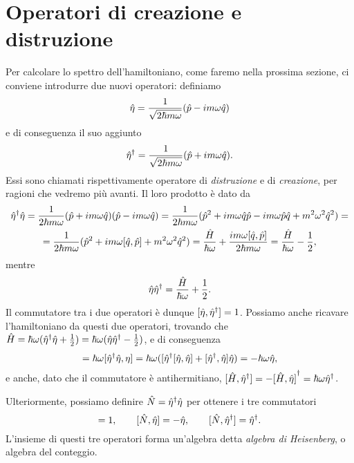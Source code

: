 \section{Operatori di creazione e distruzione}
Per calcolare lo spettro dell'hamiltoniano, come faremo nella prossima sezione, ci conviene introdurre due nuovi operatori: definiamo
\begin{equation}
	\hat{\eta}=\frac1{\sqrt{2\hbar m\omega}}(\hat{p}-im\omega\hat{q})
	\label{eq:operatore-distruzione}
\end{equation}
e di conseguenza il suo aggiunto
\begin{equation}
	{\hat{\eta}}^\dagger=\frac1{\sqrt{2\hbar m\omega}}(\hat{p}+im\omega\hat{q}).
	\label{eq:operatore-creazione}
\end{equation}
Essi sono chiamati rispettivamente operatore di \emph{distruzione} e di \emph{creazione}, per ragioni che vedremo più avanti.
Il loro prodotto è dato da
\begin{multline}
	{\hat{\eta}}^\dagger\hat{\eta}=\frac1{2\hbar m\omega}(\hat{p}+im\omega\hat{q})(\hat{p}-im\omega\hat{q})=\frac1{2\hbar m\omega}(\hat{p}^2+im\omega\hat{q}\hat{p}-im\omega\hat{p}\hat{q}+m^2\omega^2\hat{q}^2)=\\=\frac1{2\hbar m\omega}(\hat{p}^2+im\omega[\hat{q},\hat{p}]+m^2\omega^2\hat{q}^2)=\frac{\hat{H}}{\hbar\omega}+\frac{im\omega[\hat{q},\hat{p}]}{2\hbar m\omega}=\frac{\hat{H}}{\hbar\omega}-\frac12,
\end{multline}
mentre
\begin{equation}
	\hat{\eta}{\hat{\eta}}^\dagger=\frac{\hat{H}}{\hbar\omega}+\frac12.
\end{equation}
Il commutatore tra i due operatori è dunque $[\hat{\eta},{\hat{\eta}}^\dagger]=1$.
Possiamo anche ricavare l'hamiltoniano da questi due operatori, trovando che $\hat{H}=\hbar\omega({\hat{\eta}}^\dagger\hat{\eta}+\frac12)=\hbar\omega(\hat{\eta}{\hat{\eta}}^\dagger-\frac12)$, e di conseguenza
\begin{equation}
	[\op H,\op\eta]=\hbar\omega[\adj{\op\eta}\op\eta,\eta]=\hbar\omega([\adj{\op\eta}[\op\eta,\op\eta]+[\adj{\op\eta},\op\eta]\op\eta)=-\hbar\omega\op\eta,
\end{equation}
e anche, dato che il commutatore è antihermitiano, $[\hat{H},{\hat{\eta}}^\dagger]=-{[\hat{H},\hat{\eta}]}^\dagger=\hbar\omega{\hat{\eta}}^\dagger$.

Ulteriormente, possiamo definire $\hat{N}={\hat{\eta}}^\dagger\hat{\eta}$ per ottenere i tre commutatori
\begin{equation}
	[\op\eta,\adj{\op\eta}]=1,\qquad [\op N,\op\eta]=-\op\eta,\qquad [\op N,\adj{\op\eta}]=\adj{\op\eta}.
	\label{eq:algebra-heisenberg}
\end{equation}
L'insieme di questi tre operatori forma un'algebra detta \emph{algebra di Heisenberg}, o algebra del conteggio.

